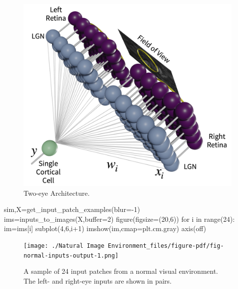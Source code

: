 \documentclass[
  letterpaper,
  DIV=11,
  numbers=noendperiod]{scrreprt}
\newenvironment{Shaded}{\begin{snugshade}}{\end{snugshade}}
\newcommand{\BuiltInTok}[1]{\textcolor[rgb]{0.00,0.23,0.31}{#1}}
\newcommand{\ControlFlowTok}[1]{\textcolor[rgb]{0.00,0.23,0.31}{#1}}
\newcommand{\DecValTok}[1]{\textcolor[rgb]{0.68,0.00,0.00}{#1}}
\newcommand{\KeywordTok}[1]{\textcolor[rgb]{0.00,0.23,0.31}{#1}}
\newcommand{\NormalTok}[1]{\textcolor[rgb]{0.00,0.23,0.31}{#1}}
\newcommand{\OperatorTok}[1]{\textcolor[rgb]{0.37,0.37,0.37}{#1}}
\newcommand{\StringTok}[1]{\textcolor[rgb]{0.13,0.47,0.30}{#1}}
\begin{document}
\begin{figure}

{\centering \includegraphics{./resources/arch.pdf}

}

\caption{\label{fig-arch}Two-eye Architecture.}

\end{figure}

\begin{Shaded}
\begin{Highlighting}[]
\NormalTok{sim,X}\OperatorTok{=}\NormalTok{get\_input\_patch\_examples(blur}\OperatorTok{={-}}\DecValTok{1}\NormalTok{)}
\NormalTok{ims}\OperatorTok{=}\NormalTok{inputs\_to\_images(X,}\BuiltInTok{buffer}\OperatorTok{=}\DecValTok{2}\NormalTok{)}
\NormalTok{figure(figsize}\OperatorTok{=}\NormalTok{(}\DecValTok{20}\NormalTok{,}\DecValTok{6}\NormalTok{))}
\ControlFlowTok{for}\NormalTok{ i }\KeywordTok{in} \BuiltInTok{range}\NormalTok{(}\DecValTok{24}\NormalTok{):}
\NormalTok{    im}\OperatorTok{=}\NormalTok{ims[i]}
\NormalTok{    subplot(}\DecValTok{4}\NormalTok{,}\DecValTok{6}\NormalTok{,i}\OperatorTok{+}\DecValTok{1}\NormalTok{)}
\NormalTok{    imshow(im,cmap}\OperatorTok{=}\NormalTok{plt.cm.gray)}
\NormalTok{    axis(}\StringTok{\textquotesingle{}off\textquotesingle{}}\NormalTok{)}
    
\end{Highlighting}
\end{Shaded}

\begin{figure}[H]

{\centering \texttt{[image: ./Natural Image Environment\_files/figure-pdf/fig-normal-inputs-output-1.png]}

}

\caption{\label{fig-normal-inputs}A sample of 24 input patches from a
normal visual environment. The left- and right-eye inputs are shown in
pairs.}

\end{figure}
\end{document}

